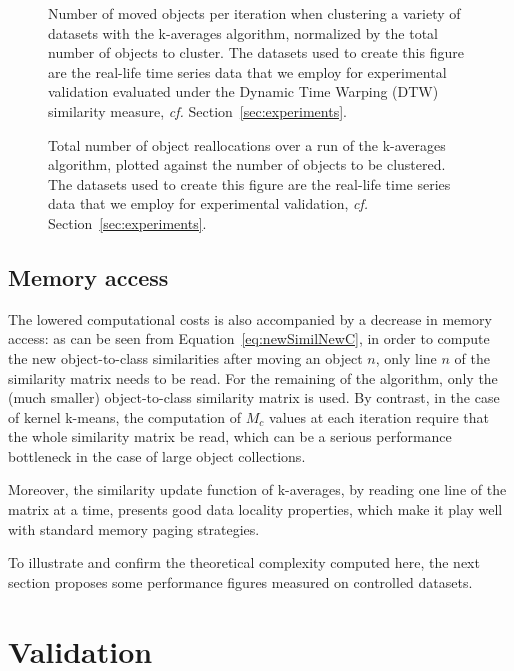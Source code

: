 \documentclass[10pt,letterpaper]{article}
\begin{document}
\begin{figure}[h]
\center
\caption{Number of moved objects per iteration when clustering a variety of datasets with the k-averages algorithm, normalized by the total number of objects to cluster. The datasets used to create this figure are the real-life time series data that we employ for experimental validation evaluated under the Dynamic Time Warping (DTW) similarity measure, \textit{cf.} Section~\ref{sec:experiments}.}
\label{fig:moved}
\end{figure}

\begin{figure}[h]
\center
\caption{Total number of object reallocations over a run of the k-averages algorithm, plotted against the number of objects to be clustered. The datasets used to create this figure are the real-life time series data that we employ for experimental validation, \textit{cf.} Section~\ref{sec:experiments}.}
\label{fig:totalMoved}
\end{figure}

\subsection{Memory access}

The lowered computational costs is also accompanied by a decrease in memory access: as can be seen from Equation~\ref{eq:newSimilNewC}, in order to compute the new object-to-class similarities after moving an object $n$, only line $n$ of the similarity matrix needs to be read. For the remaining of the algorithm, only the (much smaller) object-to-class similarity matrix is used. By contrast, in the case of kernel k-means, the computation of $M_c$ values at each iteration require that the whole similarity matrix be read, which can be a serious performance bottleneck in the case of large object collections.

Moreover, the similarity update function of k-averages, by reading one line of the matrix at a time, presents good data locality properties, which make it play well with standard memory paging strategies.

To illustrate and confirm the theoretical complexity computed here, the next section proposes some performance figures measured on controlled datasets.

\section{Validation}
\label{sec:validation}
\end{document}
